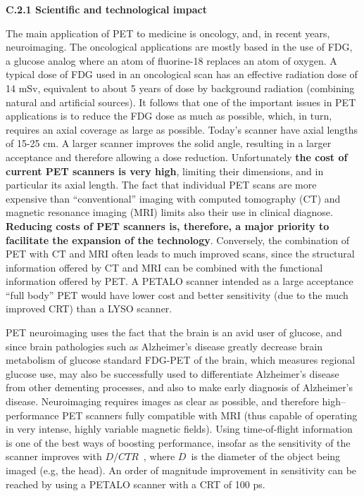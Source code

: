 \noindent\textbf{C.2.1 Scientific and technological impact}


The main application of PET to medicine is oncology, and, in recent years, neuroimaging. The oncological applications are mostly based in the use of FDG, a glucose analog where an atom of fluorine-18 replaces an atom of oxygen. 
A typical dose of FDG used in an oncological scan has an effective radiation dose of 14 mSv, equivalent to about 5 years of dose by background radiation (combining natural and artificial sources). It follows that one of the important issues in PET applications is to reduce the FDG dose as much as possible, which, in turn, requires an axial coverage as large as possible. Today's scanner have axial lengths of 15-25 cm. A larger scanner improves the solid angle, resulting in a larger acceptance and therefore allowing a dose reduction. Unfortunately {\bf the cost of current PET scanners is very high}, limiting their dimensions, and in particular its axial length. The fact that  individual PET scans are more expensive than ``conventional'' imaging with computed tomography (CT) and magnetic resonance imaging (MRI) limits also their use in clinical diagnose. {\bf Reducing costs of PET scanners is, therefore, a major priority to facilitate the expansion of the technology}. Conversely, the combination of PET with CT and MRI often leads to much improved scans, since the structural information offered by CT and MRI can be combined with the functional information offered by PET. A PETALO scanner intended as a large acceptance ``full body'' PET would have lower cost and better sensitivity (due to the much improved CRT) than a LYSO scanner.  

PET neuroimaging uses the fact that the brain is an avid user of glucose, and since brain pathologies such as Alzheimer's disease greatly decrease brain metabolism of glucose standard FDG-PET of the brain, which measures regional glucose use, may also be successfully used to differentiate Alzheimer's disease from other dementing processes, and also to make early diagnosis of Alzheimer's disease. Neuroimaging requires images as clear as possible, and therefore high--performance PET scanners fully compatible with MRI (thus capable of operating in very intense, highly variable magnetic fields). Using time-of-flight information is one of the best ways of boosting performance, insofar as the sensitivity of the scanner improves with $D/CTR$~, where $D$~is the diameter of the object being imaged (e.g, the head). An order of magnitude improvement in sensitivity can be reached by using a PETALO scanner with a CRT of 100 ps. 

